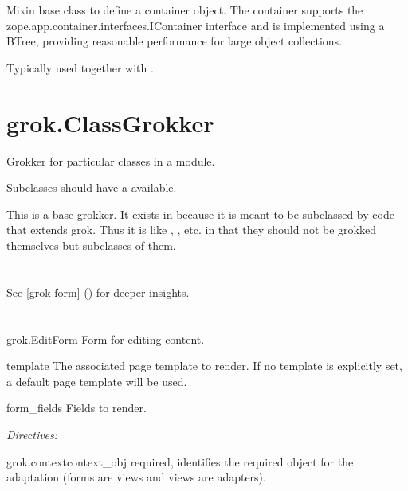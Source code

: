 \section{}

    Mixin base class to define a container object. The container supports the
    zope.app.container.interfaces.IContainer interface and is implemented using
    a BTree, providing reasonable performance for large object collections.

    Typically used together with .

\section{grok.ClassGrokker}

    Grokker for particular classes in a module.

    Subclasses should have a  available.

    This is a base grokker. It exists in 
    because it is meant to be subclassed by code that extends grok.
    Thus it is like , , etc. in
    that they should not be grokked themselves but subclasses of them.
  

\section{}
\label{grok-displayform}

    See \ref{grok-form} () for deeper insights.

\section{}
\label{grok-editform}

    \begin{classdesc*}{grok.EditForm}
        Form for editing content.

        \begin{memberdesc}{template}
            The associated page template to render. If no template is
            explicitly set, a default page template will be used.
        \end{memberdesc}

        \begin{memberdesc}{form_fields}
            Fields to render. 
        \end{memberdesc}

        \emph{Directives:}

        \begin{methoddesc}{grok.context}{context_obj}
          required, identifies the required object for the adaptation
          (forms are views and views are adapters).
        \end{methoddesc}


    \end{classdesc*}

